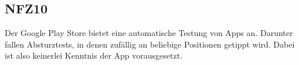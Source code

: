 \subsection*{NFZ10}

Der Google Play Store bietet eine automatische Testung von Apps an.
Darunter fallen Absturztests, in denen zufällig an beliebige Positionen getippt wird.
Dabei ist also keinerlei Kenntnis der App vorausgesetzt.